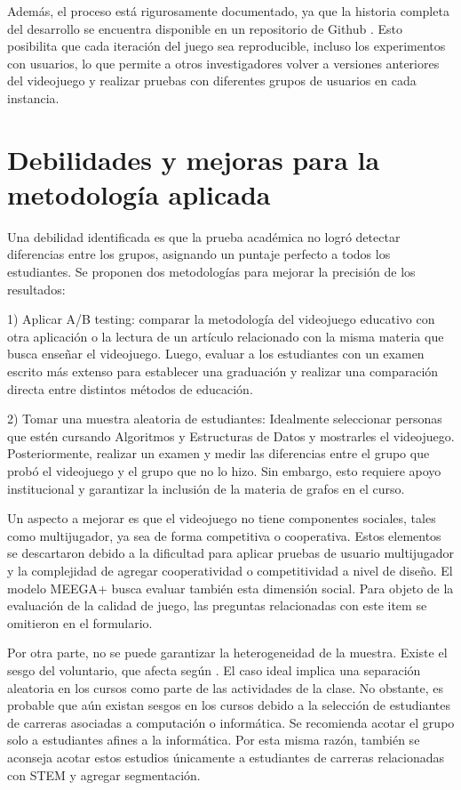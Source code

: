 Además, el proceso está rigurosamente documentado, ya que la historia completa del desarrollo se encuentra disponible en un repositorio de Github \cite{GithubRepo}. Esto posibilita que cada iteración del juego sea reproducible, incluso los experimentos con usuarios, lo que permite a otros investigadores volver a versiones anteriores del videojuego y realizar pruebas con diferentes grupos de usuarios en cada instancia.

\section{Debilidades y mejoras para la metodología aplicada}

Una debilidad identificada es que la prueba académica no logró detectar diferencias entre los grupos, asignando un puntaje perfecto a todos los estudiantes. Se proponen dos metodologías para mejorar la precisión de los resultados:

1) Aplicar A/B testing: comparar la metodología del videojuego educativo con otra aplicación o la lectura de un artículo relacionado con la misma materia que busca enseñar el videojuego. Luego, evaluar a los estudiantes con un examen escrito más extenso para establecer una graduación y realizar una comparación directa entre distintos métodos de educación.

2) Tomar una muestra aleatoria de estudiantes: Idealmente seleccionar personas que estén cursando Algoritmos y Estructuras de Datos y mostrarles el videojuego. Posteriormente, realizar un examen y medir las diferencias entre el grupo que probó el videojuego y el grupo que no lo hizo. Sin embargo, esto requiere apoyo institucional y garantizar la inclusión de la materia de grafos en el curso.

Un aspecto a mejorar es que el videojuego no tiene componentes sociales, tales como multijugador, ya sea de forma competitiva o cooperativa. Estos elementos se descartaron debido a la dificultad para aplicar pruebas de usuario multijugador y la complejidad de agregar cooperatividad o competitividad a nivel de diseño. El modelo MEEGA+ \cite{meegaplus} busca evaluar también esta dimensión social. Para objeto de la evaluación de la calidad de juego, las preguntas relacionadas con este item se omitieron en el formulario.

Por otra parte, no se puede garantizar la heterogeneidad de la muestra. Existe el sesgo del voluntario, que afecta según \cite{volunterBias}. El caso ideal implica una separación aleatoria en los cursos como parte de las actividades de la clase. No obstante, es probable que aún existan sesgos en los cursos debido a la selección de estudiantes de carreras asociadas a computación o informática. Se recomienda acotar el grupo solo a estudiantes afines a la informática. Por esta misma razón, también se aconseja acotar estos estudios únicamente a estudiantes de carreras relacionadas con STEM y agregar segmentación.

